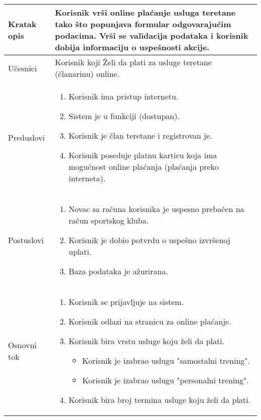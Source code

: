 \documentclass[../main.tex]{subfiles}
\begin{document}

\begin{longtable}{| p{} | p{} |} 
\hline
    Kratak opis & Korisnik vrši online plaćanje usluga teretane tako što popunjava formular odgovarajućim podacima. Vrši se validacija podataka i korisnik dobija informaciju o uspešnosti akcije.\\ 
\hline    
    Učesnici & Korisnik koji Želi da plati za usluge teretane (članarinu) online.\\
\hline
   Preduslovi & \begin{enumerate}
       \item Korisnik ima pristup internetu.
       \item Sistem je u funkciji (dostupan).
       \item Korisnik je član teretane i registrovan je.
       \item Korisnik poseduje platnu karticu koja ima mogućnost online plaćanja (plaćanja preko interneta).
   \end{enumerate}\\
\hline  
    Postuslovi & \begin{enumerate}
        \item Novac sa računa korisnika je uspesno prebačen na račun sportskog kluba.
		\item Korisnik je dobio potvrdu o uspešno izvršenoj uplati. %
        \item Baza podataka je ažurirana.
    \end{enumerate}\\
\hline
    Osnovni tok & \begin{enumerate}
        \item Korisnik se prijavljuje na sistem.
 		\item Korisnik odlazi na stranicu za online plaćanje.
 		\item Korisnik bira vrstu usluge koju želi da plati.
		\begin{itemize}
			\item Korisnik je izabrao uslugu "samostalni trening".
			\item Korisnik je izabrao uslugu "personalni trening".
		\end{itemize}
		\item Korisnik bira broj termina usluge koju želi da plati. %

\end{enumerate}
\end{longtable}
\end{document}
